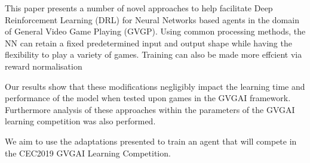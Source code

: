 This paper presents a number of novel approaches to help facilitate Deep Reinforcement Learning (DRL) for Neural Networks based agents in the domain of General Video Game Playing (GVGP).
Using common processing methods, the NN can retain a fixed predetermined input and output shape while having the flexibility to play a variety of games.
Training can also be made more effcient via reward normalisation
\par
Our results show that these modifications negligibly impact the learning time and performance of the model when tested upon games in the GVGAI framework.
Furthermore analysis of these approaches within the parameters of the GVGAI learning competition was also performed.
\par
We aim to use the adaptations presented to train an agent that will compete in the CEC2019 GVGAI Learning Competition.